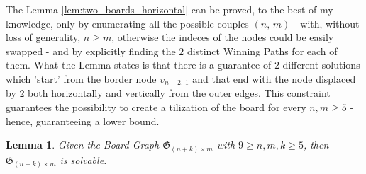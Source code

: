 \documentclass[conference]{IEEEtran}
\newtheorem{lemma}{Lemma}[section]
\begin{document}
The Lemma \ref{lem:two_boards_horizontal} can be proved, to the best of my knowledge, only by enumerating all the possible couples $(n,\,m)$ - with, without loss of generality, $n \ge m$, otherwise the indeces of the nodes could be easily swapped -
and by explicitly finding the $2$ distinct Winning Paths for each of them.
What the Lemma states is that there is a guarantee of $2$ different solutions which 'start' from the border node $v_{n-2,\,1}$ and that end with the node displaced by $2$ both horizontally and vertically from the outer edges.
This constraint guarantees the possibility to create a tilization of the board for every $n, m \ge 5$ - hence, guaranteeing a lower bound.

\begin{lemma} \label{lem:tiling}
    Given the Board Graph $\mathfrak{G}_{(n+k) \times m}$ with $9 \ge n, m, k \ge 5$, then $\mathfrak{G}_{(n + k) \times m}$ is solvable.
\end{lemma}
\end{document}
